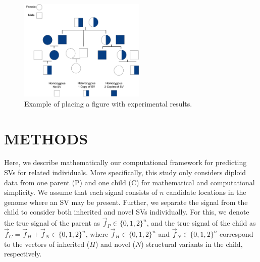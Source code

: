 \documentclass{article}
\newcommand{\fP}{\vec{f}_P }
\newcommand{\fC}{\vec{f}_C }
\newcommand{\fH}{\vec{f}_H }
\newcommand{\fN}{\vec{f}_N }
\begin{document}
	\begin{figure}[htb]
				\begin{minipage}[b]{1.0\linewidth}
						\centering
						\centerline{\includegraphics[width=6.0cm]{figs/familial_pedigree.png}}
					\end{minipage}
				\caption{Example of placing a figure with experimental results.}
				\label{fig:res}
			\end{figure}
	\section{METHODS}
	\label{sec:methods}
	
	Here, we describe mathematically our computational framework for predicting SVs for related individuals. More specifically, this study only considers diploid data from one parent (P) and one child (C) for mathematical and computational simplicity. We assume that each signal consists of $n$ candidate locations in the genome where an SV may be present. Further, we separate the signal from the child to consider both inherited and novel SVs individually. For this, we denote the true signal of the parent as $ \fP  \in \{0,1,2\}^n $, and the true signal of the child as $\fC = \fH +\fN \in \{0,1,2\}^{n}$, where $\fH \in \{0,1,2\}^n$ and $\fN \in \{0,1,2\}^n$ correspond to the vectors of inherited ($H$) and novel ($N$) structural variants in the child, respectively.
	
\end{document}
